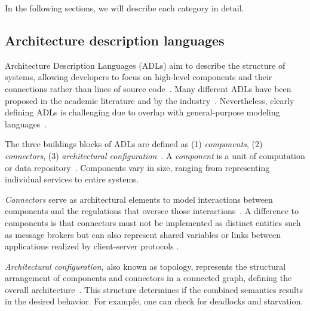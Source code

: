\documentclass[runningheads]{llncs}
\begin{document}
In the following sections, we will describe each category in detail.

\subsection{Architecture description languages} \label{subsec:adl}
Architecture Description Languages (ADLs) aim to describe the structure of systems, allowing developers to focus on high-level components and their connections rather than lines of source code~\cite{clementsSurveyArchitectureDescription1996,medvidovicClassificationComparisonFramework2000,medvidovicFrameworkClassifyingComparing1997}.
Many different ADLs have been proposed in the academic literature and by the industry~\cite{medvidovicClassificationComparisonFramework2000,woodsArchitectureDescriptionLanguages2005}.
Nevertheless, clearly defining ADLs is challenging due to overlap with general-purpose modeling languages~\cite{clementsSurveyArchitectureDescription1996}.

The three buildings blocks of ADLs are defined as (1) \textit{components}, (2) \textit{connectors}, (3) \textit{architectural configuration}~\cite{medvidovicClassificationComparisonFramework2000,medvidovicFrameworkClassifyingComparing1997}.
A \textit{component} is a unit of computation or data repository~\cite{medvidovicClassificationComparisonFramework2000}.
Components vary in size, ranging from representing individual services to entire systems.

\textit{Connectors} serve as architectural elements to model interactions between components and the regulations that oversee those interactions~\cite{medvidovicClassificationComparisonFramework2000}.
A difference to components is that connectors must not be implemented as distinct entities such as message brokers but can also represent shared variables or links between applications realized by client-server protocols \cite{medvidovicClassificationComparisonFramework2000}.

\textit{Architectural configuration}, also known as topology, represents the structural arrangement of components and connectors in a connected graph, defining the overall architecture~\cite{medvidovicClassificationComparisonFramework2000}.
This structure determines if the combined semantics results in the desired behavior.
For example, one can check for deadlocks and starvation.
\end{document}
